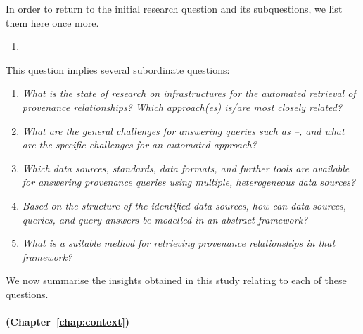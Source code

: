 In order to return to the initial research question and its subquestions,
we list them here once more.
\begin{mdframed}[
  linewidth=1pt,
  linecolor=black!50,
  innerleftmargin=0pt,innerrightmargin=0pt,
  leftline=false,rightline=false
]
  \begin{enumerate}
    \item[\RQ\phantom{\mybold{1}}]
  \end{enumerate}
\end{mdframed}
%
This question implies several subordinate questions:
%
\begin{mdframed}[
  linewidth=1pt,
  linecolor=black!50,
  innerleftmargin=0pt,innerrightmargin=0pt,
  leftline=false,rightline=false
]
  \begin{enumerate}
    \item[\subquestion{1}]
      \emph{What is the state of research on infrastructures for the automated retrieval
      of provenance relationships? Which approach(es) is/are most closely related?}
    \item[\subquestion{2}]
      \emph{What are the general challenges for answering queries such as --,
      and what are the specific challenges for an automated approach?}
    \item[\subquestion{3}]
      \emph{Which data sources, standards, data formats, and further tools
      are available for answering provenance queries using multiple, heterogeneous data sources?}
    \item[\subquestion{4}]
      \emph{Based on the structure of the identified data sources,
      how can data sources, queries, and query answers be modelled in an abstract framework?}
    \item[\subquestion{5}]
      \emph{What is a suitable method for retrieving provenance relationships
      in that framework?}
  \end{enumerate}
\end{mdframed}
%
We now summarise the insights obtained in this study relating to each of these questions.

\paragraph{\RQ[1] (Chapter~\ref{chap:context})}

